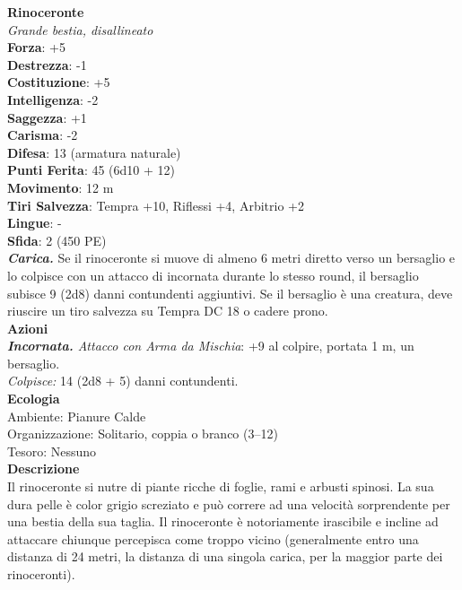 \begin{multicols}{2}
\medskip\textbf{Rinoceronte}\\
\emph{Grande bestia, disallineato}\\
\textbf{Forza}: +5\\
\textbf{Destrezza}: -1\\
\textbf{Costituzione}: +5\\
\textbf{Intelligenza}: -2\\
\textbf{Saggezza}: +1\\
\textbf{Carisma}: -2\\
\textbf{Difesa}: 13 (armatura naturale)\\
\textbf{Punti Ferita}: 45 (6d10 + 12)\\
\textbf{Movimento}: 12 m\\
\textbf{Tiri Salvezza}: Tempra +10, Riflessi +4, Arbitrio +2\\
\textbf{Lingue}: -\\
\textbf{Sfida}: 2 (450 PE)\smallskip\\
\emph{\textbf{Carica.}} Se il rinoceronte si muove di almeno 6 metri diretto verso un bersaglio e lo colpisce con un attacco di incornata durante lo stesso round, il bersaglio subisce 9 (2d8) danni contundenti aggiuntivi. Se il bersaglio è una creatura, deve riuscire un tiro salvezza su Tempra DC  18 o cadere prono.\\
\smallskip\textbf{Azioni}\\
\emph{\textbf{Incornata.} Attacco con Arma da Mischia}: +9 al colpire, portata 1 m, un bersaglio.\\
\emph{Colpisce:} 14 (2d8 + 5) danni contundenti.\\
\textbf{Ecologia}\\
Ambiente: Pianure Calde\\
Organizzazione: Solitario, coppia o branco (3–12)\\
Tesoro: Nessuno\\
\textbf{Descrizione}\\

Il rinoceronte si nutre di piante ricche di foglie, rami e arbusti spinosi. La sua dura pelle è color grigio screziato e può correre ad una velocità sorprendente per una bestia della sua taglia. Il rinoceronte è notoriamente irascibile e incline ad attaccare chiunque percepisca come troppo vicino (generalmente entro una distanza di 24 metri, la distanza di una singola carica, per la maggior parte dei rinoceronti). \\


\end{multicols}
